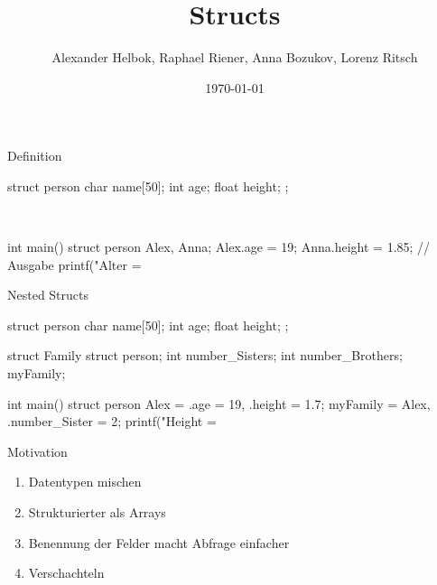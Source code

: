 \documentclass[10pt]{beamer}
\title{Structs}
\author{Alexander Helbok, Raphael Riener, Anna Bozukov, Lorenz Ritsch}
\date{\today}
\begin{document}
	\maketitle

	
	\begin{frame}[fragile]{Definition}
\begin{myr}
struct person{
	char name[50];
	int age;
	float height;
}; \end{myr}\\
\begin{myr}
int main(){
	struct person Alex, Anna;
	Alex.age = 19;
	Anna.height = 1.85;
	// Ausgabe
	printf("Alter = %
} \end{myr}
	\end{frame}
	
	
	\begin{frame}[fragile]{Nested Structs}
\begin{myr}
struct person{
	char name[50];
	int age;
	float height;
}; 

struct Family{
	struct person;
	int number_Sisters;
	int number_Brothers;
}myFamily;

int main(){
	struct person Alex = {.age = 19, .height = 1.7};
	myFamily = {Alex, .number_Sister = 2};
	printf("Height = %
}\end{myr}
	\end{frame}
	

\begin{frame}[fragile]{Motivation}
	\begin{enumerate}
		\item Datentypen mischen
		\item Strukturierter als Arrays
		\item Benennung der Felder macht Abfrage einfacher
		\item Verschachteln 
	\end{enumerate}
\end{frame}
	
\end{document}
